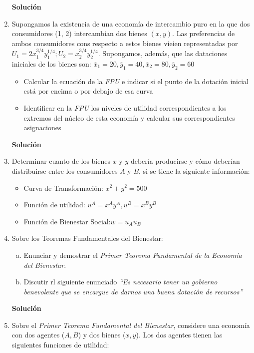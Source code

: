 \documentclass[10pt,a4paper]{article}
\begin{document}
\begin{enumerate}
\begin{itemize}
			\end{itemize}
			\textbf{\LARGE Solución}\\
				
	\item Supongamos la existencia de una economía de intercambio puro en la que dos consumidores (1, 2) intercambian dos bienes $(x,y)$. Las preferencias de ambos consumidores cons respecto a estos bienes vieien representadas por $U_1 = 2x_{1}^{3/4}y_{1}^{1/4}; U_2 = x_{2}^{3/4}y_{2}^{1/4}$. Supongamos, además, que las dataciones iniciales de los bienes son: $\overline{x}_1 = 20, \overline{y}_1 = 40, \overline{x}_2 = 80, \overline{y}_2 = 60$
			\begin{itemize}
				\item Calcular la ecuación de la \emph{FPU} e indicar si el punto de la dotación inicial está por encima o por debajo de esa curva
				\item Identificar en la \emph{FPU} los niveles de utilidad correspondientes a los extremos del núcleo de esta economía y calcular sus correspondientes asignaciones
			\end{itemize}
			\textbf{\LARGE Solución}\\
				
	\item Determinar cuanto de los bienes $x$ y $y$ debería producirse y cómo deberían distribuirse entre los consumidores $A$ y $B$, si se tiene la siguiente información:
			\begin{itemize}
				\item Curva de Transformación: $x^2 + y^2 = 500$
				\item Función de utilidad: $u^A = x^Ay^A, u^B = x^By^B$
				\item Función de Bienestar Social:$w=u_Au_B$
			\end{itemize}
	\item Sobre los Teoremas Fundamentales del Bienestar:
			\begin{enumerate}[a)]
				\item Enunciar y demostrar el \emph{Primer Teorema Fundamental de la Economía del Bienestar}.
				\item Discutir rl siguiente enunciado \textit{``Es necesario tener un gobierno benevolente que se encargue de darnos una buena dotación de recursos''}
			\end{enumerate}
			\textbf{\LARGE Solución}\\
				
	\item Sobre el \emph{Primer Teorema Fundamental del Bienestar}, considere una economía con dos agentes ($A, B$) y dos bienes ($x, y$). Los dos agentes tienen las siguientes funciones de utilidad:

\end{enumerate}
\end{document}
